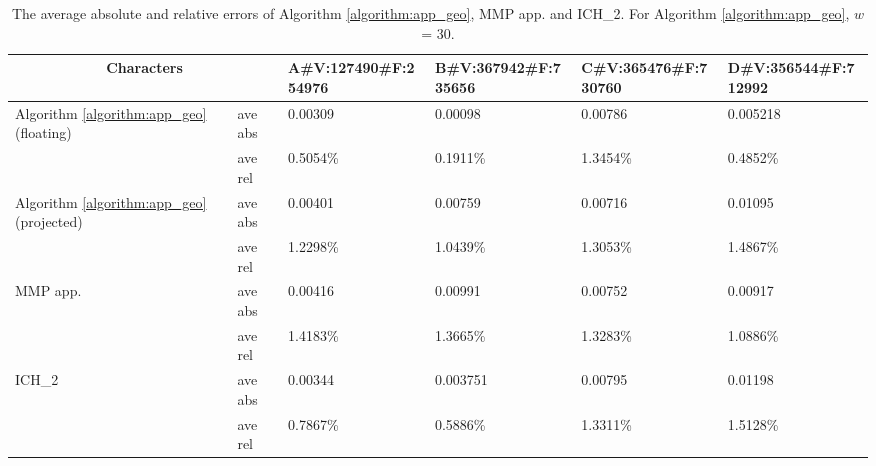 \begin{table}[H]
        \centering
       \begin{tabular}{|m{2.1cm}|m{1.5cm}|m{1.7cm}|m{1.7cm}|m{1.7cm}|m{1.7cm}|}
        \hline
        \multicolumn{2}{|c|}{Characters} & A\newline\#V:127490\newline\#F:254976 & B\newline\#V:367942\newline\#F:735656 & C\newline\#V:365476\newline\#F:730760 & D\newline\#V:356544\newline\#F:712992\\
        \hline
        \multirow{2}{\columnwidth}{Algorithm \ref{algorithm:app_geo} \newline (floating)} & ave abs & 0.00309 & 0.00098 & 0.00786 & 0.005218 \\
        \cline{2-6}
                                                                    & ave rel & 0.5054\% & 0.1911\% & 1.3454\% & 0.4852\%\\
        \hline
        \multirow{2}{\columnwidth}{Algorithm \ref{algorithm:app_geo} \newline (projected)} & ave abs & 0.00401 & 0.00759 & 0.00716 & 0.01095 \\
        \cline{2-6}
                                                                        & ave rel & 1.2298\% & 1.0439\% & 1.3053\% & 1.4867\% \\
        \hline
        \multirow{2}{\columnwidth}{MMP app.} & ave abs & 0.00416 & 0.00991 & 0.00752 & 0.00917 \\
        \cline{2-6}
                                                & ave rel & 1.4183\% & 1.3665\% & 1.3283\% & 1.0886\% \\
        \hline
        \multirow{2}{\columnwidth}{ICH\_2} & ave abs & 0.00344 & 0.003751 & 0.00795 & 0.01198 \\
        \cline{2-6}
                                                & ave rel & 0.7867\% & 0.5886\% & 1.3311\% & 1.5128\% \\
        \hline
        \end{tabular}
        \caption[Error of  Algorithm \ref{algorithm:app_geo} on character models]{The average absolute and relative errors of Algorithm \ref{algorithm:app_geo}, MMP app. and ICH\_2. For Algorithm \ref{algorithm:app_geo}, $w$ = 30.}
        \label{table:tab_2} %
\end{table}


